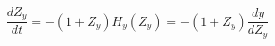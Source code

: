 \begin{equation}\label{relationy}
\frac{dZ_y}{dt}=-(1+Z_y)H_y(Z_y)=-(1+Z_y)\frac{dy}{dZ_y}
\end{equation}

